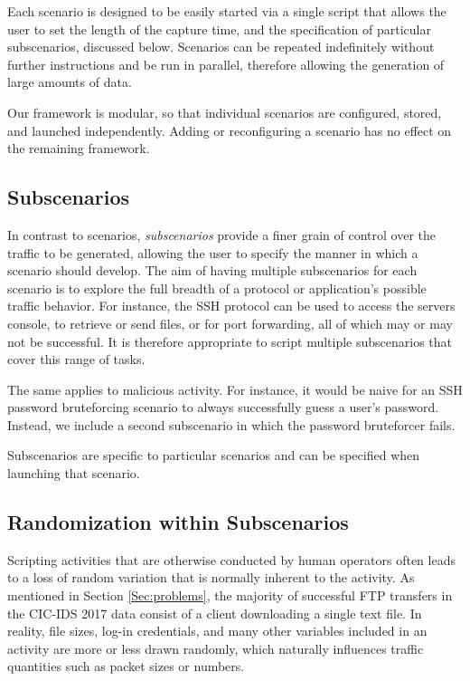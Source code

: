 Each scenario is designed to be easily started via a single script that allows the user to set the length of the capture time, and the specification of particular subscenarios, discussed below. Scenarios can be repeated indefinitely without further instructions and be run in parallel, therefore allowing the generation of large amounts of data.

Our framework is modular, so that individual scenarios are configured, stored, and launched independently. Adding or reconfiguring a scenario has no effect on the remaining framework.

\subsection{Subscenarios} \label{Sec:Subscenarios}

In contrast to scenarios, \textit{subscenarios} provide a finer grain of control over the traffic to be generated, allowing the user to specify the manner in which a scenario should develop. The aim of having multiple subscenarios for each scenario is to explore the full breadth of a protocol or application's possible traffic behavior. For instance, the SSH protocol can be used to access the servers console, to retrieve or send files, or for port forwarding, all of which may or may not be successful. It is therefore appropriate to script multiple subscenarios that cover this range of tasks.

The same applies to malicious activity. For instance, it would be naive for an SSH password bruteforcing scenario to always successfully guess a user's password. Instead, we include a second subscenario in which the password bruteforcer fails.

Subscenarios are specific to particular scenarios and can be specified when launching that scenario.

\subsection{Randomization within Subscenarios}\label{Sec:randomsubscen}

Scripting activities that are otherwise conducted by human operators often leads to a loss of random variation that is normally inherent to the activity.
As mentioned in Section \ref{Sec:problems}, the majority of successful FTP transfers in the CIC-IDS 2017 data consist of a client downloading a single text file. In reality, file sizes, log-in credentials, and many other variables included in an activity are more or less drawn randomly, which naturally influences traffic quantities such as packet sizes or numbers.

